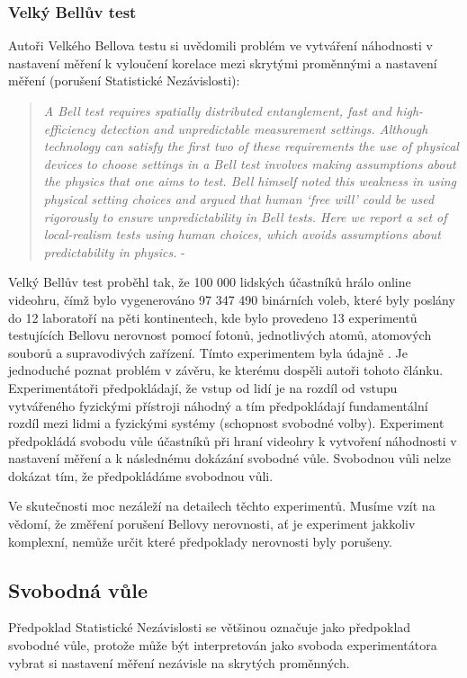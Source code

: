 \subsubsection{Velký Bellův test}
Autoři Velkého Bellova testu si uvědomili problém ve vytváření náhodnosti v nastavení měření k vyloučení korelace mezi skrytými proměnnými a nastavení měření (porušení Statistické Nezávislosti):
\begin{quote}
    \emph{A Bell test requires spatially distributed entanglement, fast and high-efficiency detection and unpredictable measurement settings. Although technology can satisfy the first two of these requirements the use of physical devices to choose settings in a Bell test involves making assumptions about the physics that one aims to test. Bell himself noted this weakness in using physical setting choices and argued that human ‘free will’ could be used rigorously to ensure unpredictability in Bell tests. Here we report a set of local-realism tests using human choices, which avoids assumptions about predictability in physics.} - \cite{BigBTest}
\end{quote}

Velký Bellův test proběhl tak, že 100 000 lidských účastníků hrálo online videohru, čímž bylo vygenerováno 97 347 490 binárních voleb, které byly poslány do 12 laboratoří na pěti kontinentech, kde bylo provedeno 13 experimentů testujících Bellovu nerovnost pomocí fotonů, jednotlivých atomů, atomových souborů a supravodivých zařízení. Tímto experimentem byla údajně . Je jednoduché poznat problém v závěru, ke kterému dospěli autoři tohoto článku. Experimentátoři předpokládají, že vstup od lidí je na rozdíl od vstupu vytvářeného fyzickými přístroji náhodný a tím předpokládají fundamentální rozdíl mezi lidmi a fyzickými systémy (schopnost svobodné volby). Experiment předpokládá svobodu vůle účastníků při hraní videohry k vytvoření náhodnosti v nastavení měření a k následnému dokázání svobodné vůle. Svobodnou vůli nelze dokázat tím, že předpokládáme svobodnou vůli.

Ve skutečnosti moc nezáleží na detailech těchto experimentů. Musíme vzít na vědomí, že změření porušení Bellovy nerovnosti, ať je experiment jakkoliv komplexní, nemůže určit které předpoklady nerovnosti byly porušeny.

\clearpage

\subsection{Svobodná vůle}
Předpoklad Statistické Nezávislosti se většinou označuje jako předpoklad svobodné vůle, protože může být interpretován jako svoboda experimentátora vybrat si nastavení měření nezávisle na skrytých proměnných.

